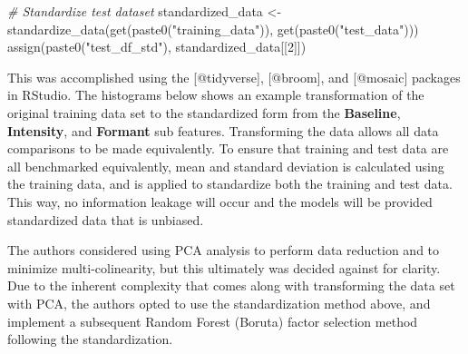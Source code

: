 \documentclass[
]{article}
\newenvironment{Shaded}{\begin{snugshade}}{\end{snugshade}}
\newcommand{\CommentTok}[1]{\textcolor[rgb]{0.56,0.35,0.01}{\textit{#1}}}
\newcommand{\DecValTok}[1]{\textcolor[rgb]{0.00,0.00,0.81}{#1}}
\newcommand{\FunctionTok}[1]{\textcolor[rgb]{0.00,0.00,0.00}{#1}}
\newcommand{\NormalTok}[1]{#1}
\newcommand{\OtherTok}[1]{\textcolor[rgb]{0.56,0.35,0.01}{#1}}
\newcommand{\StringTok}[1]{\textcolor[rgb]{0.31,0.60,0.02}{#1}}
\begin{document}
\begin{Shaded}
\begin{Highlighting}[]
\CommentTok{\# Standardize test dataset}
\NormalTok{  standardized\_data }\OtherTok{\textless{}{-}} \FunctionTok{standardize\_data}\NormalTok{(}\FunctionTok{get}\NormalTok{(}\FunctionTok{paste0}\NormalTok{(}\StringTok{"training\_data"}\NormalTok{)), }\FunctionTok{get}\NormalTok{(}\FunctionTok{paste0}\NormalTok{(}\StringTok{"test\_data"}\NormalTok{)))}
  \FunctionTok{assign}\NormalTok{(}\FunctionTok{paste0}\NormalTok{(}\StringTok{"test\_df\_std"}\NormalTok{), standardized\_data[[}\DecValTok{2}\NormalTok{]])}
\end{Highlighting}
\end{Shaded}

This was accomplished using the {[}@tidyverse{]}, {[}@broom{]}, and {[}@mosaic{]} packages in RStudio. The histograms below shows an example transformation of the original training data set to the standardized form from the \textbf{Baseline}, \textbf{Intensity}, and \textbf{Formant} sub features. Transforming the data allows all data comparisons to be made equivalently. To ensure that training and test data are all benchmarked equivalently, mean and standard deviation is calculated using the training data, and is applied to standardize both the training and test data. This way, no information leakage will occur and the models will be provided standardized data that is unbiased.

The authors considered using PCA analysis to perform data reduction and to minimize multi-colinearity, but this ultimately was decided against for clarity. Due to the inherent complexity that comes along with transforming the data set with PCA, the authors opted to use the standardization method above, and implement a subsequent Random Forest (Boruta) factor selection method following the standardization.
\end{document}
